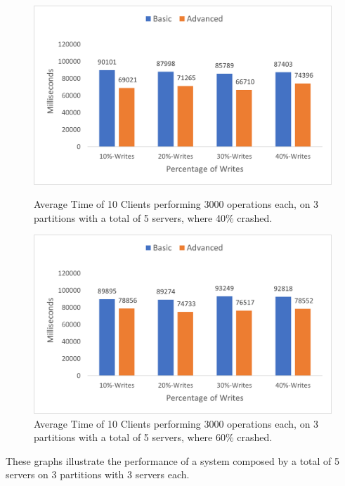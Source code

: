 \documentclass[times, 10pt,twocolumn]{article}
\begin{document}
\begin{figure}[h!]
	\centering
	\includegraphics[scale=0.65]{Graphs/Client-5-40.png}
	\caption{Average Time of 10 Clients performing 3000 operations each, on 3 partitions with a total of 5 servers, where 40\% crashed.}
	\vspace{0.15in}
	\centering
	\includegraphics[scale=0.65]{Graphs/Client-5-60.png}
	\caption{Average Time of 10 Clients performing 3000 operations each, on 3 partitions with a total of 5 servers, where 60\% crashed.}
\end{figure}
These graphs illustrate the performance of a system composed by a total of 5 servers on 3 partitions with 3 servers each.
\end{document}

